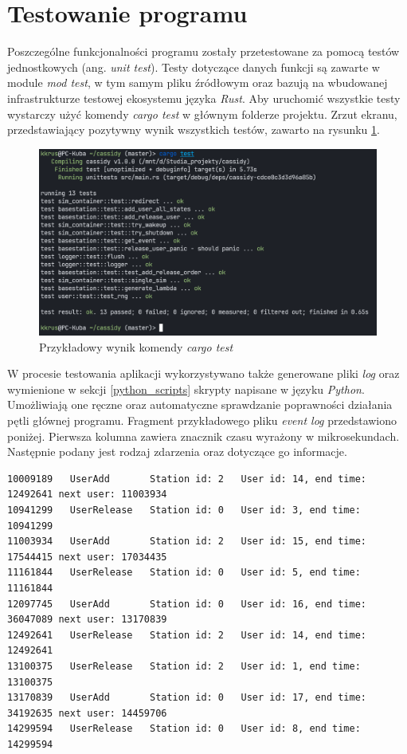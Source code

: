 \newpage
\section{Testowanie programu}
Poszczególne funkcjonalności programu zostały przetestowane za pomocą testów jednostkowych (ang. \emph{unit test}). Testy dotyczące danych funkcji są zawarte w module \emph{mod test}, w tym samym pliku źródłowym oraz bazują na wbudowanej infrastrukturze testowej ekosystemu języka \emph{Rust}. Aby uruchomić wszystkie testy wystarczy użyć komendy \emph{cargo test} w głównym folderze projektu. Zrzut ekranu, przedstawiający pozytywny wynik wszystkich testów, zawarto na rysunku \ref{regression}.

\begin{figure}[h]
\center
\includegraphics[scale=0.55]{img/tests.png} 
\caption{Przykładowy wynik komendy \emph{cargo test}}
\label{regression}
\end{figure}

\noindent W procesie testowania aplikacji wykorzystywano także generowane pliki \emph{log} oraz wymienione w sekcji \ref{python_scripts} skrypty napisane w języku \emph{Python}. Umożliwiają one ręczne oraz automatyczne sprawdzanie poprawności działania pętli głównej programu. Fragment przykładowego pliku \emph{event log} przedstawiono poniżej. Pierwsza kolumna zawiera znacznik czasu wyrażony w mikrosekundach. Następnie podany jest rodzaj zdarzenia oraz dotyczące go informacje.

\begin{verbatim}
10009189   UserAdd       Station id: 2   User id: 14, end time: 12492641 next user: 11003934
10941299   UserRelease   Station id: 0   User id: 3, end time: 10941299
11003934   UserAdd       Station id: 2   User id: 15, end time: 17544415 next user: 17034435
11161844   UserRelease   Station id: 0   User id: 5, end time: 11161844
12097745   UserAdd       Station id: 0   User id: 16, end time: 36047089 next user: 13170839
12492641   UserRelease   Station id: 2   User id: 14, end time: 12492641
13100375   UserRelease   Station id: 2   User id: 1, end time: 13100375
13170839   UserAdd       Station id: 0   User id: 17, end time: 34192635 next user: 14459706
14299594   UserRelease   Station id: 0   User id: 8, end time: 14299594
\end{verbatim}

